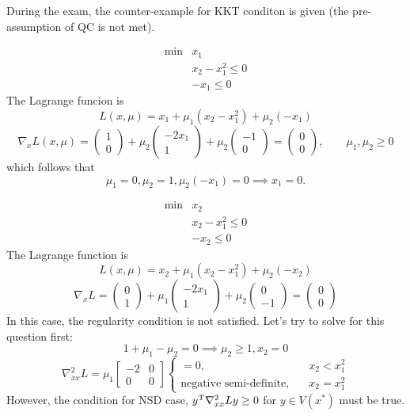 During the exam, the counter-example for KKT conditon is given (the pre-assumption of QC is not met).
\begin{example}
\[
\begin{array}{ll}
\min&x_1\\
&x_2-x_1^2\le0\\
&-x_1\le0
\end{array}
\]
The Lagrange funcion is
\[
L(x,\mu)=x_1+\mu_1(x_2-x_1^2)+\mu_2(-x_1)
\]
\[
\nabla_xL(x,\mu)=\begin{pmatrix}
1\\0
\end{pmatrix}+\mu_2\begin{pmatrix}
-2x_1\\1
\end{pmatrix}+\mu_2\begin{pmatrix}
-1\\0
\end{pmatrix}=\begin{pmatrix}
0\\0
\end{pmatrix},\qquad \mu_1,\mu_2\ge0
\]
which follows that
\[
\mu_1=0,\mu_2=1,\mu_2(-x_1)=0\implies x_1=0.
\]
\end{example}
\begin{example}
\[
\begin{array}{ll}
\min&x_2\\
&x_2-x_1^2\le0\\
&-x_2\le0
\end{array}
\]
The Lagrange function is 
\[
L(x,\mu)=x_2+\mu_1(x_2-x_1^2)+\mu_2(-x_2)
\]
\[
\nabla_xL=\begin{pmatrix}
0\\1
\end{pmatrix}+\mu_1\begin{pmatrix}
-2x_1\\1
\end{pmatrix}+\mu_2\begin{pmatrix}
0\\-1
\end{pmatrix}=\begin{pmatrix}
0\\0
\end{pmatrix}
\]
In this case, the regularity condition is not satisfied. Let's try to solve for this question first:
\[
1+\mu_1-\mu_2=0\implies
\mu_2\ge1,x_2=0
\]
\[
\nabla_{xx}^2L=\mu_1\begin{bmatrix}
-2&0\\0&0
\end{bmatrix}\left\{
\begin{aligned}
=0,&\quad x_2<x_1^2\\
\mbox{negative semi-definite},&\quad x_2=x_1^2
\end{aligned}
\right.
\]
However, the condition for NSD case, $y^{\mathrm T}\nabla_{xx}^2L y\ge0$ for $y\in V(x^*)$ must be true.
\end{example}
